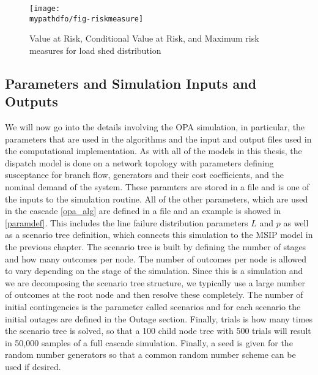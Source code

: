 \begin{figure}
\centering
\texttt{[image: \\mypathdfo/fig-riskmeasure]}
\caption[Risk Measures]{Value at Risk, Conditional Value at Risk, and Maximum risk measures for load shed distribution}\label{fig:riskmeasure}
\end{figure}



\subsection{Parameters and Simulation Inputs and Outputs}
We will now go into the details involving the OPA simulation, in particular, the parameters that are used in the algorithms and the input and output files used in the computational implementation. As with all of the models in this thesis, the dispatch model is done on a network topology with parameters defining susceptance for branch flow, generators and their cost coefficients, and the nominal demand of the system.  These paramters are stored in a  file and is one of the inputs to the simulation routine.  All of the other parameters, which are used in the cascade \cref{opa_alg} are defined in a  file and an example is showed in \cref{paramdef}.  This includes the line failure distribution parameters $L$ and $p$ as well as a scenario tree definition, which connects this simulation to the MSIP model in the previous chapter.  The scenario tree is built by defining the number of stages and how many outcomes per node.  The number of outcomes per node is allowed to vary depending on the stage of the simulation.  Since this is a simulation and we are decomposing the scenario tree structure, we typically use a large number of outcomes at the root node and then resolve these completely.  The number of initial contingencies is the parameter called scenarios and for each scenario the initial outages are defined in the Outage section.  Finally, trials is how many times the scenario tree is solved, so that a 100 child node tree with 500 trials will result in 50,000 samples of a full cascade simulation.  Finally, a seed is given for the random number generators so that a common random number scheme can be used if desired.

